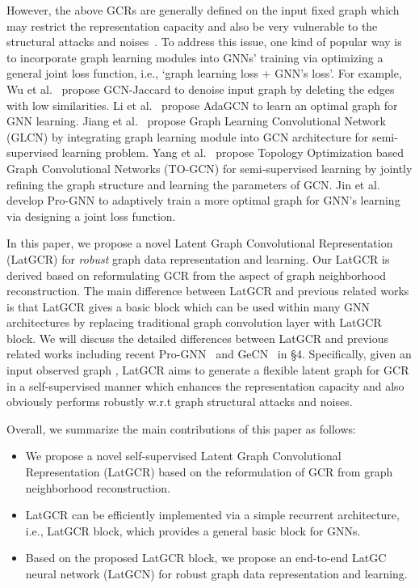 \documentclass{article}
\begin{document}
However, the above GCRs are generally defined on the input fixed graph which may restrict the representation capacity and also be very vulnerable to the  structural attacks and noises~\cite{mettack,prognn,NEURIPS2020_99e314b1}. To address this issue,
one kind of popular way is
to incorporate graph learning modules into GNNs' training via optimizing a general joint loss function, i.e., `graph learning loss + GNN's loss'.
For example,
Wu et al.~\cite{GCNJaccard} propose  GCN-Jaccard to denoise input graph by deleting the edges with low similarities.
Li et al.~\cite{AdaptiveGCN} propose  AdaGCN to learn an optimal graph for GNN learning.
Jiang et al.~\cite{GLCN} propose Graph Learning Convolutional Network (GLCN) by integrating graph learning module into GCN  architecture for semi-supervised learning problem. 
Yang et al.~\cite{TOGCN}
propose Topology Optimization based Graph Convolutional Networks (TO-GCN) for semi-supervised learning by jointly refining the graph structure and learning the parameters of GCN.
Jin et al.~\cite{prognn} develop Pro-GNN to adaptively train a more optimal graph for GNN's learning via designing a joint loss function.

In this paper, we propose a novel Latent Graph Convolutional Representation (LatGCR) for \emph{robust} graph data representation and learning.
Our LatGCR is derived based on reformulating GCR from the aspect of {graph neighborhood reconstruction}.
The main difference between LatGCR and previous related works is that LatGCR gives a basic block which can be used within many GNN architectures by replacing traditional graph convolution layer with LatGCR block. We will discuss the detailed differences between LatGCR and
previous related works including recent Pro-GNN~\cite{prognn} and GeCN~\cite{GECN} in \S 4.
Specifically, given an input observed graph , LatGCR aims to generate a flexible latent graph  for GCR in a {self-supervised} manner which enhances the representation capacity and also obviously performs robustly w.r.t graph structural attacks and noises.

Overall, we summarize the main contributions of this paper as follows:
\begin{itemize}
 \item  We propose a novel self-supervised Latent Graph Convolutional Representation (LatGCR) based on the reformulation of GCR from graph neighborhood reconstruction.
 \item LatGCR can be efficiently implemented via a simple recurrent  architecture, i.e., LatGCR block, which provides a general basic block for GNNs.
\item  Based on the proposed LatGCR block,
we propose an end-to-end  LatGC neural network (LatGCN) for robust graph data representation and learning.
\end{itemize}
\end{document}
